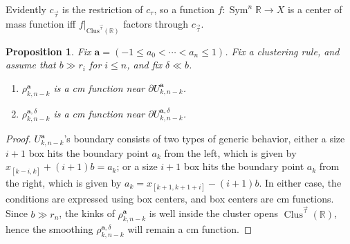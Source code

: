 \documentclass{article}
\def\R{\mathbb{R}}
\def\d{\partial}
\DeclareMathOperator{\Sym}{Sym}
\DeclareMathOperator{\Clus}{Clus}
\def\ba{\mathbf{a}} %
\newtheorem{proposition}[theorem]{Proposition}
\theoremstyle{definition}
\begin{document}
Evidently $c_{\vec \tau}$ is the restriction of $c_\tau$, so 
a function $f: \Sym^n \R \to X$ is a center of mass function iff $f|_{\mathrm{Clus}^{\vec\tau}(\R)}$ factors through $c_{\vec \tau}$.   



\begin{proposition} \label{box opens have cm boundary}
    Fix $\ba=(-1\leq a_0<\cdots<a_n \leq 1)$. Fix a clustering rule, and assume that $b \gg r_i$ for $i \le n$, and fix $\delta \ll b$.  
    \begin{enumerate}
        \item  $\rho^{\ba}_{k,n-k}$ is a cm function near $\d U^{\ba}_{k,n-k}$. 
        \item  $\rho^{\ba, \delta}_{k,n-k}$ is a cm function near $\d U^{\ba, \delta}_{k,n-k}$. 
    \end{enumerate}
    
\end{proposition}
\begin{proof}
$U^{\ba}_{k,n-k}$'s boundary consists of two types of generic behavior, either a size $i+1$ box hits the boundary point $a_k$ from the left, which is given by $x_{[k-i,k]} + (i+1)b = a_k$; or a size $i+1$ box hits the boundary point $a_k$ from the right, which is given by $a_k = x_{[k+1,k+1+i]} - (i+1)b$. In either case, the conditions are expressed using box centers, and box centers are cm functions. Since $b \gg r_n$, the kinks of $\rho^{\ba}_{k,n-k}$ is well inside the cluster opens $\Clus^{\vec \tau}(\R)$, hence the smoothing $\rho^{\ba, \delta}_{k,n-k}$ will remain a cm function. 
\end{proof}
\end{document}
